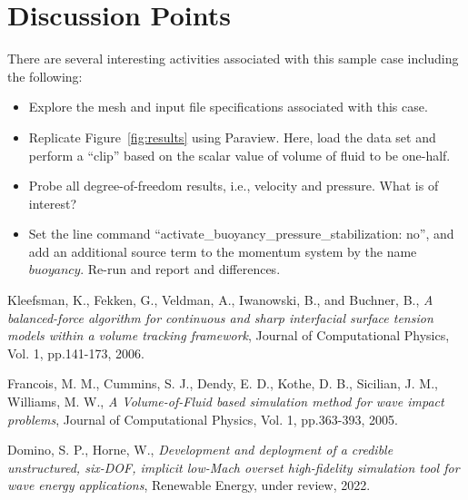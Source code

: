 \documentclass{article}
\begin{document}
\section{Discussion Points}

There are several interesting activities associated with this sample case including
the following:

\begin{itemize}
	\item Explore the mesh and input file specifications associated with this case.
	\item Replicate Figure~\ref{fig:results} using Paraview. Here, load the data set and perform a 
          ``clip'' based on the scalar value of volume of fluid to be one-half.
        \item Probe all degree-of-freedom results, i.e., velocity and pressure. What is of interest?
        \item Set the line command ``activate\_buoyancy\_pressure\_stabilization: no'', and add an
          additional source term to the momentum system by the name $buoyancy$. Re-run and report 
          and differences.
\end{itemize}

\begin{thebibliography}{100}

 Kleefsman, K., Fekken, G., Veldman, A., Iwanowski, B., and Buchner, B., \emph{A balanced-force algorithm for continuous and sharp interfacial surface tension models within a volume tracking framework}, Journal of Computational Physics, Vol. 1, pp.141-173, 2006.

 Francois, M. M.,  Cummins, S. J.,  Dendy, E. D.,  Kothe, D. B.,  Sicilian, J. M., Williams, M. W., \emph{A Volume-of-Fluid based simulation method for wave impact problems}, Journal of Computational Physics, Vol. 1, pp.363-393, 2005.

 Domino, S. P., Horne, W., \emph{Development and deployment of a credible unstructured, six-DOF, implicit low-Mach overset high-fidelity simulation tool for wave energy applications}, Renewable Energy, under review, 2022.

\end{thebibliography}
\end{document}
